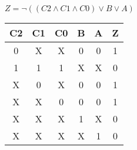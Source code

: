 
\begin{center}
    {\(Z = \lnot ((C2 \land C1 \land C0) \lor B \lor A) \)}
    \begin{table}[h] %
        \begin{center}
            \begin{tabular}{|c|c|c|c|c||c|} \hline
            C2 & C1 & C0 & B & A & Z \\ \hline\hline
            0  & X  & X  & 0 & 0 & 1 \\ \hline
            1  & 1  & 1  & X & X & 0 \\ \hline
            X  & 0  & X  & 0 & 0 & 1 \\ \hline
            X  & X  & 0  & 0 & 0 & 1 \\ \hline
            X  & X  & X  & 1 & X & 0 \\ \hline
            X  & X  & X  & X & 1 & 0 \\ \hline
            \end{tabular}
        \end{center}
    \end{table}
\end{center}
